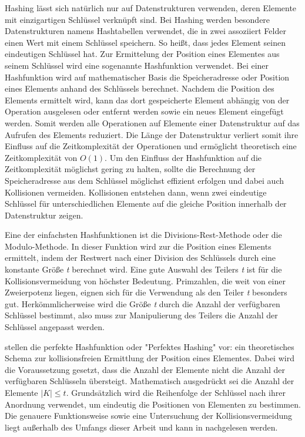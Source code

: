 Hashing lässt sich natürlich nur auf Datenstrukturen verwenden, deren Elemente mit einzigartigen Schlüssel verknüpft sind. Bei Hashing werden besondere Datenstrukturen namens Hashtabellen verwendet, die in zwei assoziiert Felder einen Wert mit einem Schlüssel speichern. So heißt, dass jedes Element seinen eindeutigen Schlüssel hat. Zur Ermittelung der Position eines Elementes aus seinem Schlüssel wird eine sogenannte Hashfunktion verwendet. Bei einer Hashfunktion wird auf mathematischer Basis die Speicheradresse oder Position eines Elements anhand des Schlüssels berechnet. Nachdem die Position des Elements ermittelt wird, kann das dort gespeicherte Element abhängig von der Operation ausgelesen oder entfernt werden sowie ein neues Element eingefügt werden. Somit werden alle Operationen auf Elemente einer Datenstruktur auf das Aufrufen des Elements reduziert. Die Länge der Datenstruktur verliert somit ihre Einfluss auf die Zeitkomplexität der Operationen und ermöglicht theoretisch eine Zeitkomplexität von $O(1)$. Um den Einfluss der Hashfunktion auf die Zeitkomplexität möglichst gering zu halten, sollte die Berechnung der Speicheradresse aus dem Schlüssel möglichst effizient erfolgen und dabei auch Kollisionen vermeiden. Kollisionen entstehen dann, wenn zwei eindeutige Schlüssel für unterschiedlichen Elemente auf die gleiche Position innerhalb der Datenstruktur zeigen. \autocite[230-231]{hubwieser_fundamente_2015}

Eine der einfachsten Hashfunktionen ist die Divisions-Rest-Methode oder die Modulo-Methode. In dieser Funktion wird zur die Position eines Elements ermittelt, indem der Restwert nach einer Division des Schlüssels durch eine konstante Größe \textit{t} berechnet wird. Eine gute Auswahl des Teilers \textit{t} ist für die Kollisionsvermeidung von höchster Bedeutung. Primzahlen, die weit von einer Zweierpotenz liegen, eignen sich für die Verwendung als den Teiler \textit{t} besonders gut. Herkömmlicherweise wird die Größe \textit{t} durch die Anzahl der verfügbaren Schlüssel bestimmt, also muss zur Manipulierung des Teilers die Anzahl der Schlüssel angepasst werden. \autocite[230-231]{hubwieser_fundamente_2015}

\Textcite[232]{hubwieser_fundamente_2015} stellen die perfekte Hashfunktion oder "Perfektes Hashing" vor: ein theoretisches Schema zur kollisionsfreien Ermittlung der Position eines Elementes. Dabei wird die Voraussetzung gesetzt, dass die Anzahl der Elemente nicht die Anzahl der verfügbaren Schlüsseln übersteigt. Mathematisch ausgedrückt sei die Anzahl der Elemente $|K| \leq t$. Grundsätzlich wird die Reihenfolge der Schlüssel nach ihrer Anordnung verwendet, um eindeutig die Positionen von Elementen zu bestimmen. Die genauere Funktionsweise sowie eine Untersuchung der Kollisionsvermeidung liegt außerhalb des Umfangs dieser Arbeit und kann in \textcite[92-94]{mehlhorn_algorithms_2008} nachgelesen werden.

